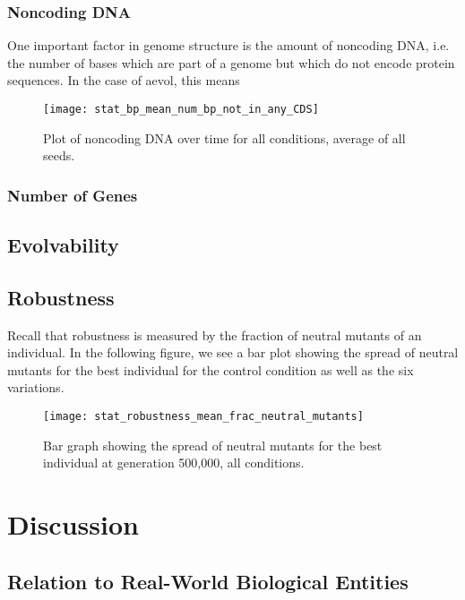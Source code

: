 \subsubsection{Noncoding DNA}
One important factor in genome structure is the amount of noncoding DNA, i.e. the number of bases which are part of a genome but which do not encode protein sequences. In the case of aevol, this means 
\begin{figure}[H]
	\centering
	\texttt{[image: stat\_bp\_mean\_num\_bp\_not\_in\_any\_CDS]}
	\caption[Noncoding DNA]{Plot of noncoding DNA over time for all conditions, average of all seeds.}
	\label{fig:noncoding_DNA}
\end{figure}

\subsubsection{Number of Genes}

\subsection{Evolvability}

\subsection{Robustness}
Recall that robustness is measured by the fraction of neutral mutants of an individual. In the following figure, we see a bar plot showing the spread of neutral mutants for the best individual for the control condition as well as the six variations. 

\begin{figure}[H]
	\centering
	\texttt{[image: stat\_robustness\_mean\_frac\_neutral\_mutants]}
	\caption[Robustness bar graph]{Bar graph showing the spread of neutral mutants for the best individual at generation 500,000, all conditions.}
	\label{fig:robustness_all_conditions}
\end{figure}

\section{Discussion}\label{discussion}

\subsection{Relation to Real-World Biological Entities}

